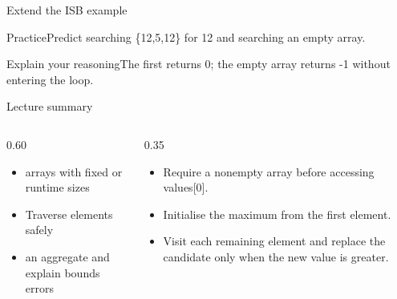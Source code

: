 \documentclass[10pt,aspectratio=169]{beamer}
\begin{document}
\begin{frame}[fragile,t]{Extend the ISB example}
\begin{alertblock}{Practice}Predict searching \{12,5,12\} for 12 and searching an empty array.\end{alertblock}\vspace{3mm}\begin{exampleblock}{Explain your reasoning}The first returns 0; the empty array returns {-}1 without entering the loop.\end{exampleblock}
\end{frame}
\begin{frame}[fragile,t]{Lecture summary}
\begin{columns}[T,onlytextwidth]\begin{column}{0.60\textwidth}
\begin{itemize}
\item arrays with fixed or runtime sizes
\item Traverse elements safely
\item an aggregate and explain bounds errors
\end{itemize}
\end{column}\begin{column}{0.35\textwidth}\small
\begin{itemize}
\item Require a nonempty array before accessing values[0].
\item Initialise the maximum from the first element.
\item Visit each remaining element and replace the candidate only when the new value is greater.
\end{itemize}
\end{column}\end{columns}
\end{frame}
\end{document}
